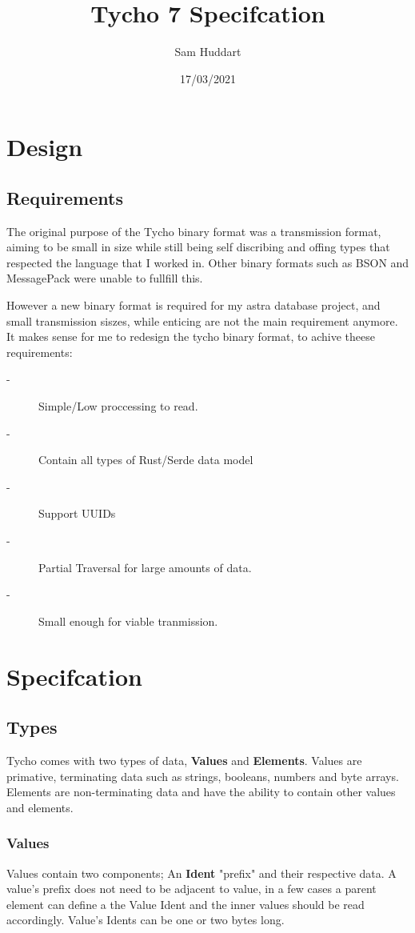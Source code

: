 \documentclass{report}
\author{Sam Huddart}
\title{Tycho 7 Specifcation}
\date {17/03/2021}
\begin{document}
\maketitle

\section {Design}
\subsection{Requirements}

The original purpose of the Tycho binary format was a transmission format, aiming to be small in size while still being
self discribing and offing types that respected the language that I worked in. Other binary formats such as BSON and
MessagePack were unable to fullfill this.

However a new binary format is required for my astra database project, and small transmission siszes, while enticing are not
the main requirement anymore. It makes sense for me to redesign the tycho binary format, to achive theese requirements:

\begin{description}
    \item[-] Simple/Low proccessing to read.
    \item[-] Contain all types of Rust/Serde data model
    \item[-] Support UUIDs
    \item[-] Partial Traversal for large amounts of data.
    \item[-] Small enough for viable tranmission.
\end{description}

\section{Specifcation}
\subsection{Types}
Tycho comes with two types of data, \textbf{Values} and \textbf{Elements}. Values are primative, terminating data such as
strings, booleans, numbers and byte arrays. Elements are non-terminating data and have the ability to contain other
values and elements.

\subsubsection{Values}
Values contain two components; An \textbf{Ident} "prefix" and their respective data. A value's prefix does not need to be
adjacent to value, in a few cases a parent element can define a the Value Ident and the inner values should be read
accordingly. Value's Idents can be one or two bytes long.
\end{document}

